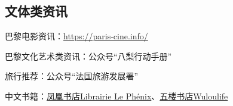 \subsection{文体类资讯}

巴黎电影资讯：\href{https://paris-cine.info/}{https://paris-cine.info/}

巴黎文化艺术类资讯：公众号“八梨行动手册”

旅行推荐：公众号“法国旅游发展署”

中文书籍：\href{https://www.librairielephenix.fr/}{凤凰书店Librairie Le Phénix}、\href{https://wulolife.com/}{五楼书店Wuloulife}
